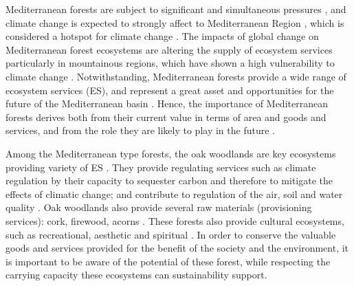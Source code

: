 Mediterranean forests are subject to significant and simultaneous pressures \autocites{FAOPlanBleu2018StateMediterranean, DoblasMirandaetal2017ReviewCombination}, and climate change is expected to strongly affect to Mediterranean Region \autocite{GiorgiLionello2008ClimateChange, Penuelasetal2017ImpactsGlobal,Crameretal2018ClimateChange,Crameretal2020ClimateEnvironmental}, which is considered a hotspot for climate change \autocite{Giorgi2006ClimateChange}. The impacts of global change on Mediterranean forest ecosystems are altering the supply of ecosystem services \autocite{Lindneretal2010ClimateChange,Lindneretal2014ClimateChange,NoceSantini2018MediterraneanForest,Penuelasetal2017ImpactsGlobal,SerradaHierroetal2011ImpactosVulnerabilidad} particularly in mountainous regions, which have shown a high vulnerability to climate change \autocite{Schroteretal2005EcosystemService}. Notwithstanding, Mediterranean forests provide a wide range of ecosystem services (ES), and represent a great asset and opportunities for the future of the Mediterranean basin \autocite{Gauquelinetal2018MediterraneanForests, NoceSantini2018MediterraneanForest}. Hence, the importance of Mediterranean forests derives both from their current value in terms of area and goods and services, and from the role they are likely to play in the future \autocites{FAOPlanBleu2018StateMediterranean}.

Among the Mediterranean type forests, the oak woodlands are key ecosystems providing variety of ES \autocite{Maranonetal2020IberianOaks}. They provide regulating services such as climate regulation by their capacity to sequester carbon and therefore to mitigate the effects of climatic change; and contribute to regulation of the air, soil and water quality \autocite{Maranonetal2012EstadoTendencia}. Oak woodlands also provide several raw materials (provisioning services): cork, firewood, acorns \autocite{Bugalhoetal2011MediterraneanCork}. These forests also provide cultural ecosystems, such as recreational, aesthetic and spiritual \autocite{Lofetal2016ManagementOak}. In order to conserve the valuable goods and services provided for the benefit of the society and the environment, it is important to be aware of the potential of these forest, while respecting the carrying capacity these ecosystems can sustainability support. 


